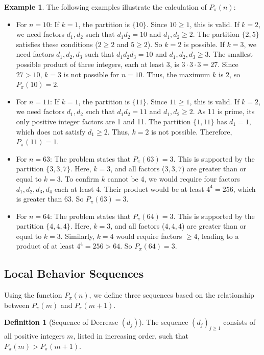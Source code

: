 \documentclass[]{article}
\theoremstyle{plain}%
\theoremstyle{definition}
\newtheorem{defn}{Definition}[section]
\newtheorem{exmp}{Example}[section]
\theoremstyle{remark}
\begin{document}
	\begin{exmp}
		The following examples illustrate the calculation of $P_{\pi}(n)$:
		\begin{itemize}
			\item For $n=10$:
			If $k=1$, the partition is $\{10\}$. Since $10 \ge 1$, this is valid.
			If $k=2$, we need factors $d_1, d_2$ such that $d_1 d_2 = 10$ and $d_1, d_2 \ge 2$. The partition $\{2,5\}$ satisfies these conditions ($2 \ge 2$ and $5 \ge 2$). So $k=2$ is possible.
			If $k=3$, we need factors $d_1, d_2, d_3$ such that $d_1 d_2 d_3 = 10$ and $d_1, d_2, d_3 \ge 3$. The smallest possible product of three integers, each at least 3, is $3 \cdot 3 \cdot 3 = 27$. Since $27 > 10$, $k=3$ is not possible for $n=10$.
			Thus, the maximum $k$ is 2, so $P_{\pi}(10)=2$.
			
			\item For $n=11$:
			If $k=1$, the partition is $\{11\}$. Since $11 \ge 1$, this is valid.
			If $k=2$, we need factors $d_1, d_2$ such that $d_1 d_2 = 11$ and $d_1, d_2 \ge 2$. As 11 is prime, its only positive integer factors are 1 and 11. The partition $\{1,11\}$ has $d_1=1$, which does not satisfy $d_1 \ge 2$. Thus, $k=2$ is not possible.
			Therefore, $P_{\pi}(11)=1$.
			
			\item For $n=63$:
			The problem states that $P_{\pi}(63)=3$. This is supported by the partition $\{3,3,7\}$. Here, $k=3$, and all factors ($3,3,7$) are greater than or equal to $k=3$.
			To confirm $k$ cannot be 4, we would require four factors $d_1, d_2, d_3, d_4$ each at least 4. Their product would be at least $4^4 = 256$, which is greater than 63. So $P_{\pi}(63)=3$.
			
			\item For $n=64$:
			The problem states that $P_{\pi}(64)=3$. This is supported by the partition $\{4,4,4\}$. Here, $k=3$, and all factors ($4,4,4$) are greater than or equal to $k=3$.
			Similarly, $k=4$ would require factors $\ge 4$, leading to a product of at least $4^4=256 > 64$. So $P_{\pi}(64)=3$.
		\end{itemize}
	\end{exmp}
	\subsection{Local Behavior Sequences}
	Using the function $P_{\pi}(n)$, we define three sequences based on the relationship between $P_{\pi}(m)$ and $P_{\pi}(m+1)$.
	
	\begin{defn}[Sequence of Decrease $(d_j)$]
		The sequence $(d_j)_{j \ge 1}$ consists of all positive integers $m$, listed in increasing order, such that $P_{\pi}(m) > P_{\pi}(m+1)$.
	\end{defn}
	
\end{document}
